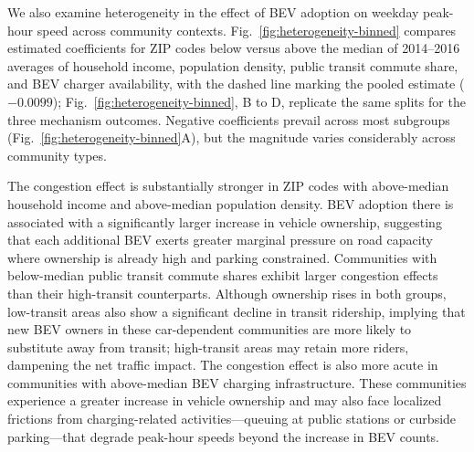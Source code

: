 \documentclass[11pt, letterpaper]{article}
\begin{document}
We also examine heterogeneity in the effect of BEV adoption on weekday peak-hour speed across community contexts.
Fig.~\ref{fig:heterogeneity-binned} compares estimated coefficients for ZIP codes below versus above the median of 2014--2016 averages of household income, population density, public transit commute share, and BEV charger availability, with the dashed line marking the pooled estimate ($-0.0099$); Fig.~\ref{fig:heterogeneity-binned}, B to D, replicate the same splits for the three mechanism outcomes.
Negative coefficients prevail across most subgroups (Fig.~\ref{fig:heterogeneity-binned}A), but the magnitude varies considerably across community types.

\begin{table} [H]
    \centering
    \caption{\small \textbf{Effects of BEV adoption on vehicle ownership, traffic flow, and transit ridership.}}
    \begin{footnotesize}
        
    \end{footnotesize}
    \label{tab:twfe-mechanism-regs}
\end{table}


The congestion effect is substantially stronger in ZIP codes with above-median household income and above-median population density.
BEV adoption there is associated with a significantly larger increase in vehicle ownership, suggesting that each additional BEV exerts greater marginal pressure on road capacity where ownership is already high and parking constrained.
Communities with below-median public transit commute shares exhibit larger congestion effects than their high-transit counterparts.
Although ownership rises in both groups, low-transit areas also show a significant decline in transit ridership, implying that new BEV owners in these car-dependent communities are more likely to substitute away from transit; high-transit areas may retain more riders, dampening the net traffic impact.
The congestion effect is also more acute in communities with above-median BEV charging infrastructure.
These communities experience a greater increase in vehicle ownership and may also face localized frictions from charging-related activities---queuing at public stations or curbside parking---that degrade peak-hour speeds beyond the increase in BEV counts.
\end{document}
